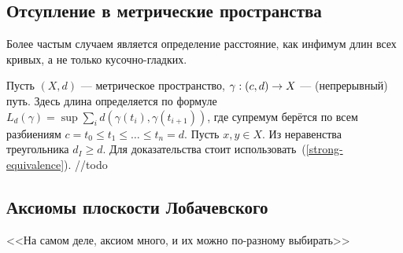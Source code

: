 \documentclass[a4paper]{report}
\begin{document}
    \subsection{Отсупление в метрические пространства}
    Более частым случаем является определение расстояние, как инфимум длин всех кривых, а не только кусочно-гладких.

    Пусть $(X, d)$ --- метрическое пространство, $\gamma: (c, d) \rightarrow X$ --- (непрерывный) путь.
    Здесь длина определяется по формуле $L_d(\gamma) = \sup\sum\limits_{i}d(\gamma(t_i), \gamma(t_{i+1}))$, где супремум берётся по всем разбиениям $c = t_0 \le t_1 \le \dots \le t_n = d$.
    Пусть $x, y \in X$.
    Из неравенства треугольника $d_I \ge d$.
    Для доказательства стоит использовать~(\cref{strong-equivalence}).
    //todo
    \subsection{Аксиомы плоскости Лобачевского}
    <<На самом деле, аксиом много, и их можно по-разному выбирать>>
\end{document}
